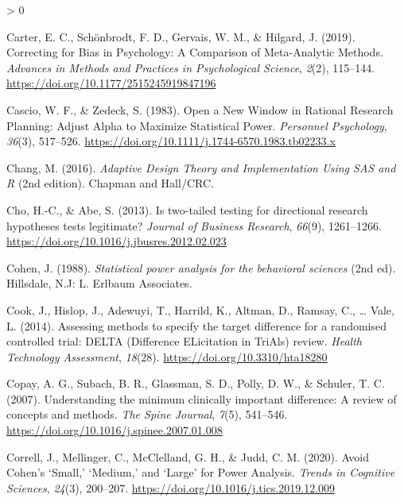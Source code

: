 \documentclass[
  english,
  ,jou, a4paper,floatsintext]{apa6}
\newlength{\cslhangindent}
\newenvironment{CSLReferences}[2] %
 {%
  \setlength{\parindent}{0pt}
  \ifodd #1 \everypar{\setlength{\hangindent}{\cslhangindent}}\ignorespaces\fi
  \ifnum #2 > 0
  \setlength{\parskip}{#2\baselineskip}
  \fi
 }%
 {}
\begin{document}
\begin{CSLReferences}{1}{0}
\leavevmode\hypertarget{ref-carter_correcting_2019}{}%
Carter, E. C., Schönbrodt, F. D., Gervais, W. M., \& Hilgard, J. (2019). Correcting for {Bias} in {Psychology}: A {Comparison} of {Meta}-{Analytic Methods}. \emph{Advances in Methods and Practices in Psychological Science}, \emph{2}(2), 115--144. \url{https://doi.org/10.1177/2515245919847196}

\leavevmode\hypertarget{ref-cascio_open_1983}{}%
Cascio, W. F., \& Zedeck, S. (1983). Open a {New Window} in {Rational Research Planning}: Adjust {Alpha} to {Maximize Statistical Power}. \emph{Personnel Psychology}, \emph{36}(3), 517--526. \url{https://doi.org/10.1111/j.1744-6570.1983.tb02233.x}

\leavevmode\hypertarget{ref-chang_adaptive_2016}{}%
Chang, M. (2016). \emph{Adaptive {Design Theory} and {Implementation Using SAS} and {R}} (2nd edition). {Chapman and Hall/CRC}.

\leavevmode\hypertarget{ref-cho_is_2013}{}%
Cho, H.-C., \& Abe, S. (2013). Is two-tailed testing for directional research hypotheses tests legitimate? \emph{Journal of Business Research}, \emph{66}(9), 1261--1266. \url{https://doi.org/10.1016/j.jbusres.2012.02.023}

\leavevmode\hypertarget{ref-cohen_statistical_1988}{}%
Cohen, J. (1988). \emph{Statistical power analysis for the behavioral sciences} (2nd ed). {Hillsdale, N.J}: {L. Erlbaum Associates}.

\leavevmode\hypertarget{ref-cook_assessing_2014}{}%
Cook, J., Hislop, J., Adewuyi, T., Harrild, K., Altman, D., Ramsay, C., \ldots{} Vale, L. (2014). Assessing methods to specify the target difference for a randomised controlled trial: {DELTA} ({Difference ELicitation} in {TriAls}) review. \emph{Health Technology Assessment}, \emph{18}(28). \url{https://doi.org/10.3310/hta18280}

\leavevmode\hypertarget{ref-copay_understanding_2007}{}%
Copay, A. G., Subach, B. R., Glassman, S. D., Polly, D. W., \& Schuler, T. C. (2007). Understanding the minimum clinically important difference: A review of concepts and methods. \emph{The Spine Journal}, \emph{7}(5), 541--546. \url{https://doi.org/10.1016/j.spinee.2007.01.008}

\leavevmode\hypertarget{ref-correll_avoid_2020}{}%
Correll, J., Mellinger, C., McClelland, G. H., \& Judd, C. M. (2020). Avoid {Cohen}'s {`{Small},'} {`{Medium},'} and {`{Large}'} for {Power Analysis}. \emph{Trends in Cognitive Sciences}, \emph{24}(3), 200--207. \url{https://doi.org/10.1016/j.tics.2019.12.009}


\end{CSLReferences}
\end{document}
